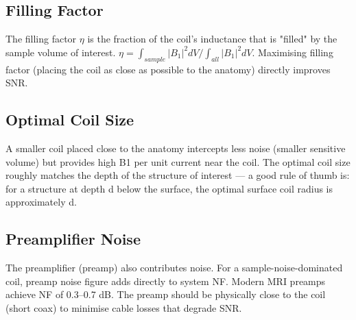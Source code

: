 				

\subsection{Filling Factor}

				

The filling factor $\eta$ is the fraction of the coil's inductance that is "filled" by the sample volume of interest. $\eta = \int_{sample}|B_1|^2 dV / \int_{all}|B_1|^2 dV$. Maximising filling factor (placing the coil as close as possible to the anatomy) directly improves SNR.

				

\subsection{Optimal Coil Size}

				

A smaller coil placed close to the anatomy intercepts less noise (smaller sensitive volume) but provides high B1 per unit current near the coil. The optimal coil size roughly matches the depth of the structure of interest — a good rule of thumb is: for a structure at depth d below the surface, the optimal surface coil radius is approximately d.

				

\subsection{Preamplifier Noise}

				

The preamplifier (preamp) also contributes noise. For a sample-noise-dominated coil, preamp noise figure adds directly to system NF. Modern MRI preamps achieve NF of 0.3–0.7 dB. The preamp should be physically close to the coil (short coax) to minimise cable losses that degrade SNR.



